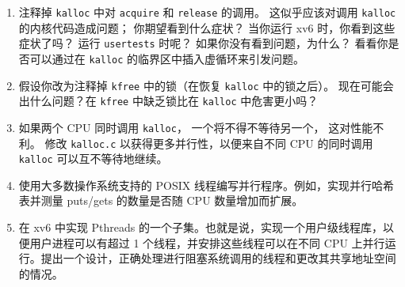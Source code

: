 \begin{enumerate}
  
\item 注释掉
\lstinline{kalloc}
中对
\lstinline{acquire}
和
\lstinline{release}
的调用。
这似乎应该对调用
\lstinline{kalloc}
的内核代码造成问题；
你期望看到什么症状？
当你运行 xv6 时，你看到这些症状了吗？
运行
\lstinline{usertests}
时呢？
如果你没有看到问题，为什么？
看看你是否可以通过在
\lstinline{kalloc}
的临界区中插入虚循环来引发问题。

\item 假设你改为注释掉
\lstinline{kfree}
中的锁（在恢复
\lstinline{kalloc}
中的锁之后）。
现在可能会出什么问题？在
\lstinline{kfree}
中缺乏锁比在
\lstinline{kalloc}
中危害更小吗？

\item 如果两个 CPU 同时调用
\lstinline{kalloc}，
一个将不得不等待另一个，
这对性能不利。
修改
\lstinline{kalloc.c}
以获得更多并行性，以便来自不同 CPU 的同时调用
\lstinline{kalloc}
可以互不等待地继续。

\item 使用大多数操作系统支持的 POSIX 线程编写并行程序。例如，实现并行哈希表并测量 puts/gets 的数量是否随 CPU 数量增加而扩展。

\item 在 xv6 中实现 Pthreads 的一个子集。也就是说，实现一个用户级线程库，以便用户进程可以有超过 1 个线程，并安排这些线程可以在不同 CPU 上并行运行。提出一个设计，正确处理进行阻塞系统调用的线程和更改其共享地址空间的情况。

\end{enumerate}

